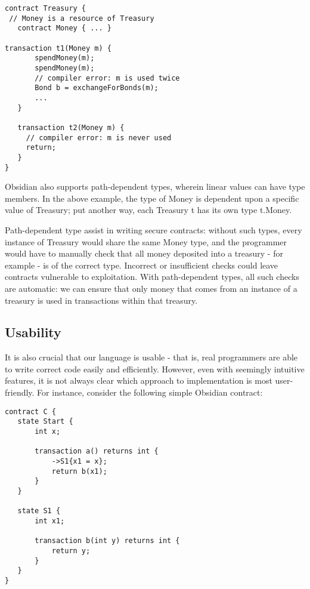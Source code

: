 \documentclass[sigplan,10pt,review,anonymous]{acmart}\settopmatter{printfolios=true}
\begin{document}
\begin{lstlisting}[caption={Linear resources in Obsidian},captionpos=b]
contract Treasury {
 // Money is a resource of Treasury
   contract Money { ... }

transaction t1(Money m) {
       spendMoney(m);
       spendMoney(m);
       // compiler error: m is used twice
       Bond b = exchangeForBonds(m);
       ...
   }

   transaction t2(Money m) {
     // compiler error: m is never used
     return;
   }
}
\end{lstlisting}

Obsidian also supports path-dependent types, wherein linear values can have type members. In the 
above example, the type of Money is dependent upon a specific value of Treasury; put another way, 
each Treasury t has its own type t.Money. 

Path-dependent type assist in writing secure contracts: without such types, every instance of 
Treasury would share the same Money type, and the programmer would have to manually check 
that all money deposited into a treasury - for example - is of the correct type. Incorrect or insufficient 
checks could leave contracts vulnerable to exploitation. With path-dependent types, all such checks 
are automatic: we can ensure that only money that comes from an instance of a treasury is used in 
transactions within that treasury. 

\subsection{Usability}
It is also crucial that our language is usable - that is, real programmers are able to write correct 
code easily and efficiently. However, even with seemingly intuitive features, it is not always clear 
which approach to implementation is most user-friendly. For instance, consider the following simple 
Obsidian contract:

\begin{lstlisting}
contract C {
   state Start {
       int x;
  
       transaction a() returns int {
           ->S1{x1 = x};
           return b(x1);
       }
   }
  
   state S1 {
       int x1;
      
       transaction b(int y) returns int {
           return y;
       }
   }
}
\end{lstlisting}
\end{document}
